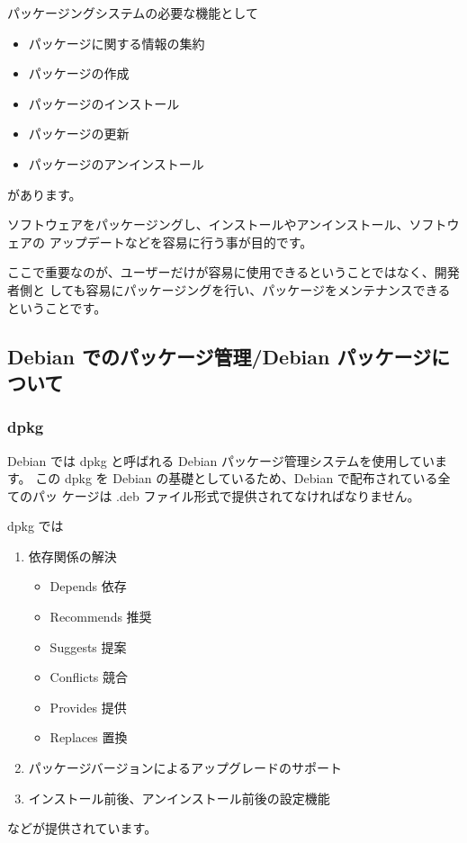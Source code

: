 \documentclass[mingoth,a4paper]{jsarticle}
\begin{document}
パッケージングシステムの必要な機能として
\begin{itemize}
	\item パッケージに関する情報の集約
	\item パッケージの作成
	\item パッケージのインストール
	\item パッケージの更新
	\item パッケージのアンインストール
\end{itemize}
があります。

ソフトウェアをパッケージングし、インストールやアンインストール、ソフトウェアの
アップデートなどを容易に行う事が目的です。

ここで重要なのが、ユーザーだけが容易に使用できるということではなく、開発者側と
しても容易にパッケージングを行い、パッケージをメンテナンスできるということです。




\subsection{Debian でのパッケージ管理/Debian パッケージについて}

\subsubsection{dpkg}

	Debian では dpkg と呼ばれる Debian パッケージ管理システムを使用しています。
	この dpkg を Debian の基礎としているため、Debian で配布されている全てのパッ
	ケージは .deb ファイル形式で提供されてなければなりません。
	
	dpkg では
	\begin{enumerate}
		\item 依存関係の解決

			\begin{itemize}
				\item Depends                 依存
				\item Recommends              推奨
				\item Suggests                提案
				\item Conflicts               競合
				\item Provides                提供
				\item Replaces                置換
			\end{itemize}

		\item パッケージバージョンによるアップグレードのサポート

		\item インストール前後、アンインストール前後の設定機能
	\end{enumerate}
	などが提供されています。
\end{document}
